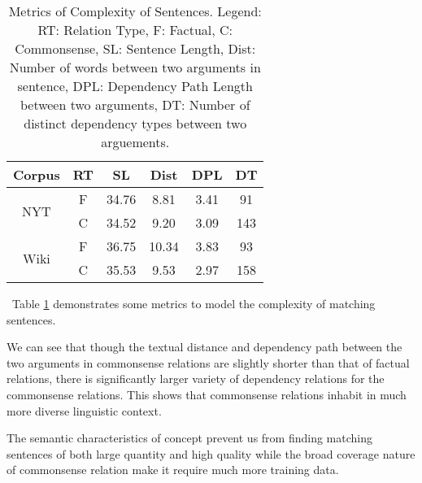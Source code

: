 \documentclass[11pt,a4paper]{article}
\newcommand{\tabref}[1]{Table \ref{#1}}
\newcommand{\KZ}[1]{\textcolor{blue}{Kenny: #1}}
\begin{document}
\begin{table}[th]
	\small
	\centering
	\begin{tabular}{|c|c|c|c|c|c|}
		\hline
		\textbf{Corpus}& \textbf{RT} & \textbf{SL} & \textbf{Dist} & \textbf{DPL} & \textbf{DT} \\ \hline
		\multirow{2}{*}{NYT}       & F& 34.76                       & 8.81                  & 3.41                     & 91                        \\ \cline{2-6} 
		& C& 34.52                       & 9.20                  & 3.09                     & 143                       \\ \hline
		\multirow{2}{*}{Wiki} & F& 36.75                       & 10.34                 & 3.83                     & 93                        \\ \cline{2-6} 
		& C& 35.53                       & 9.53                  & 2.97                     & 158                       \\ \hline
	\end{tabular}
	\caption{Metrics of Complexity of Sentences. Legend: RT: Relation Type, F: Factual, C: Commonsense, 
		SL: Sentence Length, Dist: Number of words between two arguments in sentence, DPL: Dependency Path Length between two arguments, DT: Number of distinct dependency types between two arguements.} 
	\label{table:complexity metric}
\end{table}
	



~\tabref{table:complexity metric} demonstrates some metrics to model the complexity of matching 
sentences.


We can see that though the textual distance and dependency path between
the two arguments in commonsense relations are slightly shorter than that
of factual relations, there is significantly larger variety of
dependency relations for the commonsense relations. 
This shows that commonsense relations inhabit in much more diverse linguistic
context. 	

The semantic characteristics of concept prevent us from finding matching 
sentences of both large quantity and high quality while the 
broad coverage nature of commonsense relation make it require 
much more training data.
	
\end{document}
